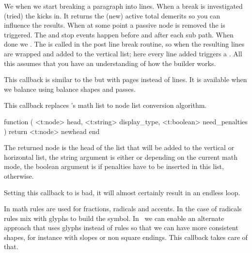 We  when we start breaking a paragraph into lines. When a break
is investigated (tried) the  kicks in. It returns the (new) \quote
{active total demerits} so you can influence the results. When at some point a
passive node is removed the  is triggered. The  and \typ
{stop} events happen before and after each sub path. When done we .
The  is called in the post line break routine, so when the
resulting lines are wrapped and added to the vertical list; here every line added
triggers a . All this assumes that you have an understanding of how
the builder works.

\stopsubsection

\startsubsection[title=balance_check]

This callback is similar to the  but with pages instead of
lines. It is available when we balance using balance shapes and passes.

\stopsubsection

\stopsection

\startsection[title=Math]

\startsubsection[title=mlist_to_hlist]

This callback replaces \LUATEX's math list to node list conversion algorithm.

\starttyping[option=LUA]
function (
    <t:node>    head,
    <t:string>  display_type,
    <t:boolean> need_penalties
)
    return <t:node> newhead
end
\stoptyping

The returned node is the head of the list that will be added to the vertical or
horizontal list, the string argument is either  or 
depending on the current math mode, the boolean argument is  if
penalties have to be inserted in this list,  otherwise.

Setting this callback to  is bad, it will almost certainly result in
an endless loop.

\stopsubsection

\startsubsection[title=math_rule]

In math rules are used for fractions, radicals and accents. In the case of
radicals rules mix with glyphs to build the symbol. In \CONTEXT\ we can enable an
alternate approach that uses glyphs instead of rules so that we can have more
consistent shapes, for instance with slopes or non square endings. This callback
takes care of that.

